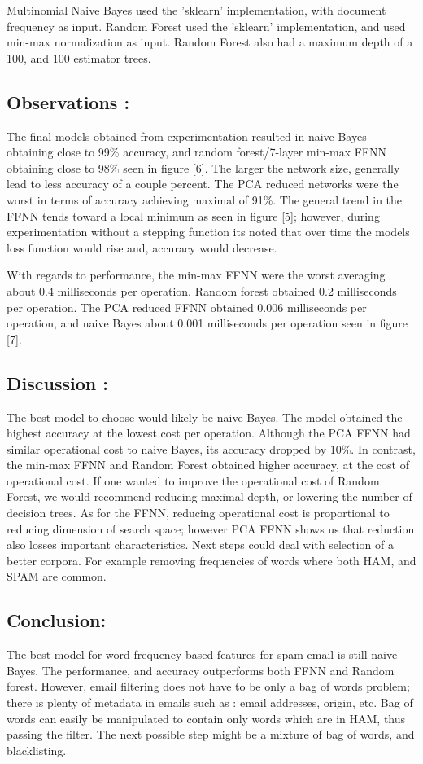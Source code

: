 \documentclass[a4paper,11pt]{article}
\begin{document}
Multinomial Naive Bayes used the 'sklearn' implementation, with document frequency as input.
Random Forest used the 'sklearn' implementation, and used min-max normalization as input. Random Forest also had a maximum depth of a 100, and 100 estimator trees. 

\subsection*{Observations : }
The final models obtained from experimentation resulted in naive Bayes obtaining close to 99\% accuracy, and random forest/7-layer min-max FFNN obtaining close to 98\% seen in figure [6]. The larger the network size, generally lead to less accuracy of a couple percent. The PCA reduced networks were the worst in terms of accuracy achieving maximal of 91\%.
The general trend in the FFNN tends toward a local minimum as seen in figure [5]; however, during experimentation without a stepping function its noted that over time the models loss function would rise and, accuracy would decrease.

With regards to performance, the min-max FFNN were the worst averaging about 0.4 milliseconds per operation. Random forest obtained 0.2 milliseconds per operation. The PCA reduced FFNN obtained 0.006  milliseconds per operation, and naive Bayes about 0.001 milliseconds per operation seen in figure [7].

\subsection*{Discussion : }
The best model to choose would likely be naive Bayes. The model obtained the highest accuracy at the lowest cost per operation. Although the PCA FFNN had similar operational cost to naive Bayes, its accuracy dropped by 10\%. In contrast, the min-max FFNN and Random Forest obtained higher accuracy, at the cost of operational cost. If one wanted to improve the operational cost of Random Forest, we would recommend reducing maximal depth, or lowering the number of decision trees. As for the FFNN, reducing operational cost is proportional to reducing dimension of search space; however PCA FFNN shows us that reduction also losses important characteristics. Next steps could deal with selection of a better corpora. For example removing frequencies of words where both HAM, and SPAM are common. 

\subsection*{Conclusion:}
The best model for word frequency based features for spam email is still naive Bayes.
The performance, and accuracy outperforms both FFNN and Random forest.
However, email filtering does not have to be only a bag of words problem; there is plenty of metadata in emails such as : email addresses, origin, etc.  Bag of words can easily be manipulated to contain only words which are in HAM, thus passing the filter. The next possible step might be a mixture of bag of words, and blacklisting. 
\end{document}

